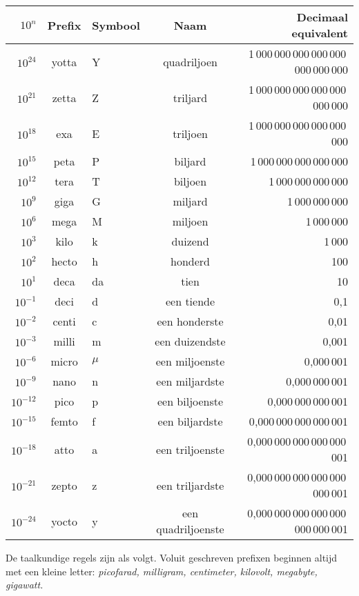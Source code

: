 \documentclass[a5paper]{article}
\begin{document}
\renewcommand{\arraystretch}{1.2}
\begin{center}
\begin{tabular}{>{\bfseries}r c l c r}
\hline
$10^n$ & Prefix & Symbool & Naam & Decimaal equivalent \\
\hline
$10^{24}$ & yotta & Y & quadriljoen & 1\,000\,000\,000\,000\,000\,000\,000\,000 \\
$10^{21}$ & zetta & Z & triljard & 1\,000\,000\,000\,000\,000\,000\,000 \\
$10^{18}$ & exa & E & triljoen & 1\,000\,000\,000\,000\,000\,000 \\
$10^{15}$ & peta & P & biljard & 1\,000\,000\,000\,000\,000 \\
$10^{12}$ & tera & T & biljoen & 1\,000\,000\,000\,000 \\
$10^{9}$  & giga & G & miljard & 1\,000\,000\,000 \\
$10^{6}$  & mega & M & miljoen & 1\,000\,000 \\
$10^{3}$  & kilo & k & duizend & 1\,000 \\
$10^{2}$  & hecto & h & honderd & 100 \\
$10^{1}$  & deca & da & tien & 10 \\
$10^{-1}$ & deci & d & een tiende & 0{,}1 \\
$10^{-2}$ & centi & c & een honderste & 0{,}01 \\
$10^{-3}$ & milli & m & een duizendste & 0{,}001 \\
$10^{-6}$ & micro & $\mu$ & een miljoenste & 0{,}000\,001 \\
$10^{-9}$ & nano & n & een miljardste & 0{,}000\,000\,001 \\
$10^{-12}$ & pico & p & een biljoenste & 0{,}000\,000\,000\,001 \\
$10^{-15}$ & femto & f & een biljardste & 0{,}000\,000\,000\,000\,001 \\
$10^{-18}$ & atto & a & een triljoenste & 0{,}000\,000\,000\,000\,000\,001 \\
$10^{-21}$ & zepto & z & een triljardste & 0{,}000\,000\,000\,000\,000\,000\,001 \\
$10^{-24}$ & yocto & y & een quadriljoenste & 0{,}000\,000\,000\,000\,000\,000\,000\,001 \\
\hline
\end{tabular}
\end{center}

\vspace{1em}

\noindent
De taalkundige regels zijn als volgt. Voluit geschreven prefixen beginnen altijd met een kleine letter:
\emph{picofarad, milligram, centimeter, kilovolt, megabyte, gigawatt.}
\end{document}
